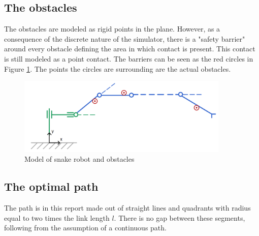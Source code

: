 

\subsection{The obstacles}

The obstacles are modeled as rigid points in the plane. However, as a consequence of the discrete nature of the simulator, there is a "safety barrier" around every obstacle defining the area in which contact is present. This contact is still modeled as a point contact. The barriers can be seen as the red circles in Figure \ref{fig:2_kin_obst}. The points the circles are surrounding are the actual obstacles.

\begin{figure}
    \centering
    \includegraphics[width=0.9\textwidth]{figures/kinematics_obstacles_noname.PNG}
    \caption{Model of snake robot and obstacles}
    \label{fig:2_kin_obst}
\end{figure}


\subsection{The optimal path}

The path is in this report made out of straight lines and quadrants with radius equal to two times the link length $l$. There is no gap between these segments, following from the assumption of a continuous path.
